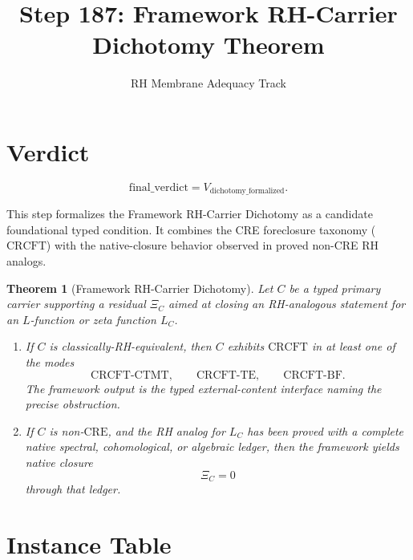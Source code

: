 \documentclass[11pt]{article}
\title{Step 187: Framework RH-Carrier Dichotomy Theorem}
\author{RH Membrane Adequacy Track}
\date{}
\newtheorem{theorem}{Theorem}
\newcommand{\CRE}{\mathrm{CRE}}
\newcommand{\CRCFT}{\mathrm{CRCFT}}
\newcommand{\CTMT}{\mathrm{CTMT}}
\newcommand{\XiC}{\Xi_C}
\begin{document}
\maketitle

\section*{Verdict}

\[
\boxed{\mathrm{final\_verdict}=V_{\mathrm{dichotomy\_formalized}}.}
\]

This step formalizes the Framework RH-Carrier Dichotomy as a candidate
foundational typed condition.  It combines the CRE foreclosure taxonomy
(\(\CRCFT\)) with the native-closure behavior observed in proved non-CRE RH
analogs.

\begin{theorem}[Framework RH-Carrier Dichotomy]
Let \(C\) be a typed primary carrier supporting a residual \(\XiC\) aimed at
closing an RH-analogous statement for an \(L\)-function or zeta function
\(L_C\).

\begin{enumerate}
\item If \(C\) is classically-RH-equivalent, then \(C\) exhibits \(\CRCFT\) in
at least one of the modes
\[
\CRCFT\text{-}\CTMT,\qquad
\CRCFT\text{-TE},\qquad
\CRCFT\text{-BF}.
\]
The framework output is the typed external-content interface naming the
precise obstruction.
\item If \(C\) is non-\(\CRE\), and the RH analog for \(L_C\) has been proved
with a complete native spectral, cohomological, or algebraic ledger, then the
framework yields native closure
\[
\XiC=0
\]
through that ledger.
\end{enumerate}
\end{theorem}

\section*{Instance Table}
\end{document}
